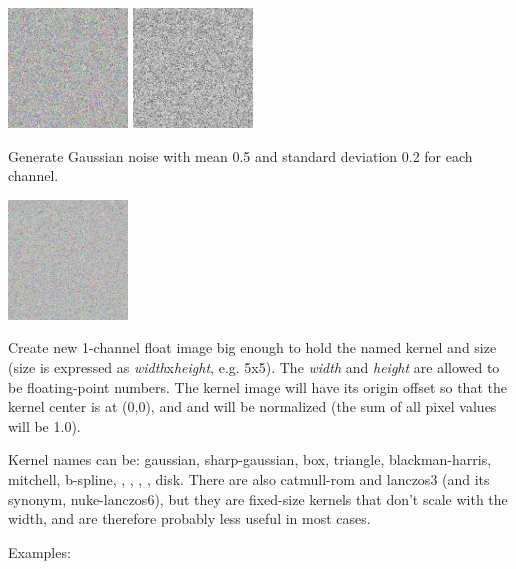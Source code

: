\spc \includegraphics[width=1.25in]{figures/unifnoise3.jpg}
\spc \includegraphics[width=1.25in]{figures/unifnoise1.jpg}
\apiend

\vspace{10pt}
Generate Gaussian noise with mean 0.5 and standard deviation 0.2 for each channel.

\spc \includegraphics[width=1.25in]{figures/gaussnoise.jpg}
\apiend

\apiend


Create new 1-channel {\cf float} image big enough to hold the named
kernel and size (size is expressed as \emph{width}{\cf x}\emph{height},
e.g. {\cf 5x5}).  The \emph{width} and \emph{height} are allowed to be
floating-point numbers. The kernel image will have its origin offset so
that the kernel center is at (0,0), and and will be normalized (the sum
of all pixel values will be 1.0).

Kernel names can be: {\cf gaussian}, {\cf sharp-gaussian}, {\cf box},
{\cf triangle}, {\cf blackman-harris}, {\cf mitchell}, {\cf b-spline},
, , , , {\cf disk}.
There are also {\cf catmull-rom} and {\cf lanczos3} (and its synonym,
{\cf nuke-lanczos6}), but
they are fixed-size kernels that don't scale with the width, and are
therefore probably less useful in most cases.

\noindent Examples:

